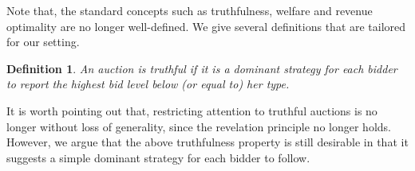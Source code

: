 \documentclass[letterpaper]{article}
\newtheorem{definition}{Definition}
\begin{document}
Note that, the standard concepts such as truthfulness, welfare and revenue optimality are no longer well-defined. We give several definitions that are tailored for our setting.



%


\begin{definition}
	An auction is {\em truthful} if it is a dominant strategy for each bidder to report the highest bid level below (or equal to) her type.
\end{definition}

It is worth pointing out that, restricting attention to truthful auctions is no longer without loss of generality, since the revelation principle no longer holds. However, we argue that the above truthfulness property is still desirable in that it suggests a simple dominant strategy for each bidder to follow.
\end{document}
